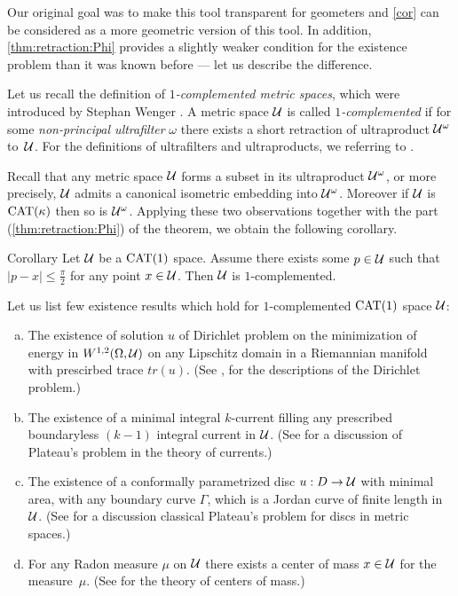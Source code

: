 \documentclass[oneside,a4paper, 12pt]{article}
\begin{document}
Our original goal was to make this tool transparent for geometers and \ref{cor} can be considered as a more geometric version of this tool.
In addition, \ref{thm:retraction:Phi} provides a slightly weaker condition for the existence problem than it was known before --- let us describe the difference. 

 
Let us recall the definition of \emph{$1$-complemented metric spaces},
which were introduced by Stephan Wenger \cite{Wenger-1comp}.
A metric space ${\mathcal{U}}$ is called \emph{$1$-complemented} if for some \emph{non-principal ultrafilter} $\omega$  there exists a short retraction of ultraproduct ${\mathcal{U}}^{\omega}$ to~${\mathcal{U}}$.
For the definitions of ultrafilters and ultraproducts, we referring to \cite{Wenger-1comp,Wenger-2comp,akp}. 

Recall that any metric space ${\mathcal{U}}$ forms a subset in its ultraproduct ${\mathcal{U}}^{\omega}$, or more precisely, ${\mathcal{U}}$ admits a canonical isometric embedding into ${\mathcal{U}}^{\omega}$.
Moreover if ${\mathcal{U}}$ is $\mathrm{CAT}(\kappa)$ then so is ${\mathcal{U}}^\omega$. 
Applying these two observations together with the part (\ref{thm:retraction:Phi}) of the theorem, we obtain  the following corollary.

\begin{thm}{Corollary}
Let ${\mathcal{U}}$ be  a $\mathrm{CAT}(1)$ space.
Assume  there exists some $p\in {\mathcal{U}}$ such that $|p-x|\le \tfrac\pi2$ for any point $x\in {\mathcal{U}}$.
Then ${\mathcal{U}}$ is $1$-complemented.
\end{thm}

Let us list few existence results which hold for $1$-complemented $\mathrm{CAT}(1)$ space ${\mathcal{U}}$:
\begin{enumerate}[(a)]
\item\label{dirichlet}   The existence of solution $u$ of Dirichlet problem on the minimization of energy 
in $W^{1,2} (\Omega, {\mathcal{U}})$ on any Lipschitz domain in a Riemannian manifold with prescirbed trace $tr(u)$.
(See \cite{KS,Guo}, 
for the descriptions of the Dirichlet problem.)
\item The existence of a minimal integral $k$-current filling any prescribed boundaryless $(k-1)$ integral current in ${\mathcal{U}}$. 
(See \cite{Ambrosio,Wenger-1comp} for a discussion of Plateau's problem in  the theory of currents.)
\item   The existence of a conformally parametrized disc $u:D\to {\mathcal{U}}$ with minimal area, with any  boundary curve $\Gamma$, which is a Jordan curve of finite length in ${\mathcal{U}}$.
(See \cite{LWplateau, Wenger-2comp} for a discussion classical Plateau's problem for discs in metric spaces.)
\item\label{center} For any Radon measure $\mu$ on ${\mathcal{U}}$ there exists a center of mass $x\in {\mathcal{U}}$ for the measure~$\mu$. (See \cite{Sturm, Yokota} for the theory of centers of mass.)
\end{enumerate}
\end{document}
